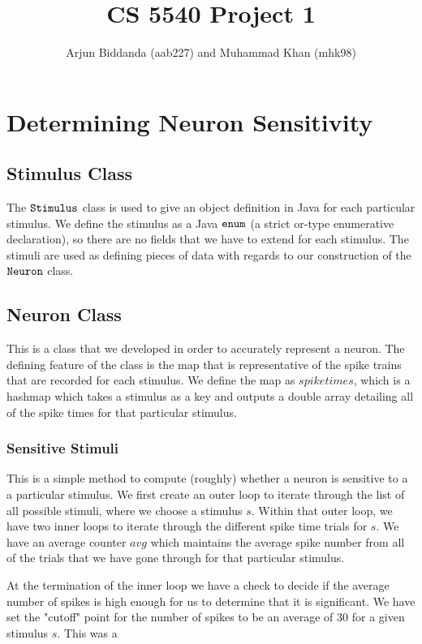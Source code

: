 \documentclass[12pt]{article} %
\title{CS 5540 Project 1}
\author{Arjun Biddanda (aab227) and Muhammad Khan (mhk98)}
\begin{document}
\maketitle

\section{Determining Neuron Sensitivity}
\subsection{Stimulus Class}
The $\tt{Stimulus}$ class is used to give an object definition in Java for each particular stimulus. We define the stimulus as a Java $\tt{enum}$ (a strict or-type enumerative declaration), so there are no fields that we have to extend for each stimulus. The stimuli are used as defining pieces of data with regards to our construction of the $\tt{Neuron}$ class.

\subsection{Neuron Class}
This is a class that we developed in order to accurately represent a neuron. The defining feature of the class is the map that is representative of the spike trains that are recorded for each stimulus. We define the map as $spiketimes$, which is a hashmap which takes a stimulus as a key and outputs a double array detailing all of the spike times for that particular stimulus. 
\subsubsection{Sensitive Stimuli}
This is a simple method to compute (roughly) whether a neuron is sensitive to a a particular stimulus. We first create an outer loop to iterate through the list of all possible stimuli, where we choose a stimulus $s$. Within that outer loop, we have two inner loops to iterate through the different spike time trials for $s$. We have an average counter $avg$ which maintains the average spike number from all of the trials that we have gone through for that particular stimulus. 

At the termination of the inner loop we have a check to decide if the average number of spikes is high enough for us to determine that it is significant. We have set the "cutoff" point for the number of spikes to be an average of 30 for a given stimulus $s$. This was a 
\end{document}
